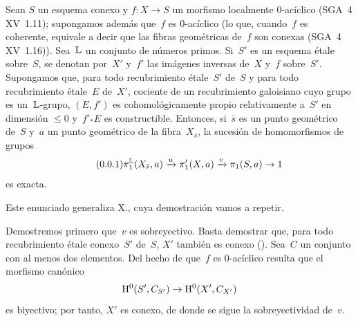 
\begin{proposition}
\label{XIII.4.1}
\setcounter{subsection}{\value{proposition}}%
Sean $S$ un esquema conexo y $f\colon X\to S$ un morfismo localmente
$0$-acíclico \textup{(SGA~4 XV~1.11)}; supongamos además que~$f$ es
$0$-acíclico (lo que, cuando~$f$ es coherente, equivale a decir que las
fibras geométricas de~$f$ son conexas \textup{(SGA~4 XV~1.16)}). Sea~$\mathbb L$
un conjunto de números primos. Si~$S'$ es un esquema étale sobre~$S$, se
denotan por~$X'$ y~$f'$ las imágenes inversas de~$X$ y~$f$ sobre~$S'$.
Supongamos que, para todo recubrimiento étale~$S'$ de~$S$ y para todo
recubrimiento étale~$E$ de~$X'$, cociente de un recubrimiento galoisiano
cuyo grupo es un~$\mathbb L$-grupo, $(E,f')$ es cohomológicamente propio
relativamente a~$S'$ en dimensión $\leqslant 0$ y~$f'_*E$ es constructible.
Entonces, si~$\bar{s}$ es un punto geométrico de~$S$ y~$a$ un punto
geométrico de la fibra~$X_{\bar{s}}$, la sucesión de homomorfismos de grupos
\begin{equation*}
\label{eq:XIII.4.1.1}
\tag{\thesubsection.1}
\pi_1^{\LL}(X_{\bar{s}},a)\lto{u} \pi_1'(X,a)\lto{v}\pi_1(S,a)\to1
\end{equation*}
es exacta.
\end{proposition}

Este enunciado generaliza X., cuya demostración vamos a repetir.

Demostremos primero que~$v$ es sobreyectivo. Basta demostrar que, para todo
recubrimiento étale conexo~$S'$ de~$S$, $X'$ también es conexo
(). Sea~$C$ un conjunto con al menos dos elementos. Del hecho
de que~$f$ es $0$-acíclico resulta que el morfismo canónico
$$
\mathrm H^0(S',C_{S'})\to \mathrm H^0(X',C_{X'})
$$
es biyectivo; por tanto, $X'$ es conexo, de donde se sigue la sobreyectividad
de~$v$.

